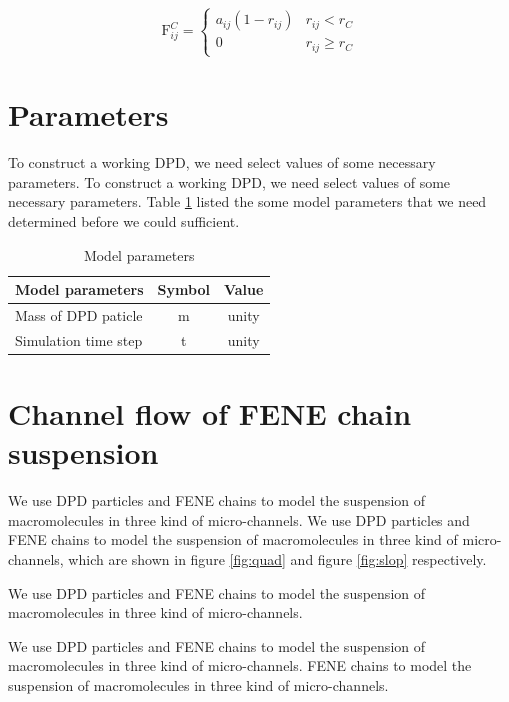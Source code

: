 \documentclass[12pt]{article}
\begin{document}
\begin{equation}
\mathrm{F}_{ij}^C=
\left\{\begin{array}{ll}
a_{ij}(1-r_{ij})&r_{ij}<r_C\\
0&r_{ij}\geq r_C
\end{array}\right.
\end{equation}

\section{Parameters}
To construct a working DPD, we need select values of some necessary parameters. To construct a working DPD, we need select values of some necessary parameters. Table \ref{tab:mopa}  listed the some model parameters that we need determined before we could sufficient.
\begin{table}[htb]
\centering
\caption{Model parameters}\label{tab:mopa}
\begin{tabular}{|l|c|c|}
\hline
\textbf{Model parameters}&\textbf{Symbol}&\textbf{Value}\\
\hline
Mass of DPD paticle&m&unity\\
\hline
Simulation time step& t&unity\\
\hline
\end{tabular}
\end{table}

\section{Channel flow of FENE chain suspension}
We use DPD particles and FENE chains to model the suspension of macromolecules in three kind of micro-channels. We use DPD particles and FENE chains to model the suspension of macromolecules in three kind of micro-channels, which are shown in figure \ref{fig:quad} and figure \ref{fig:slop} respectively.

We use DPD particles and FENE chains to model the suspension of macromolecules in three kind of micro-channels. \par
We use DPD particles and FENE chains to model the suspension of macromolecules in three kind of micro-channels. FENE chains to model the suspension of macromolecules in three kind of micro-channels. 
\end{document}
